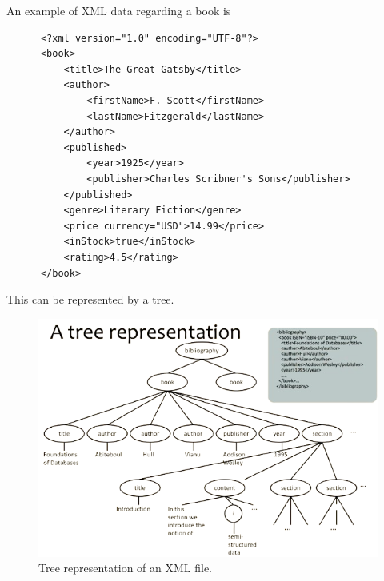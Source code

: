   \begin{example}
    An example of XML data regarding a book is 
    \begin{lstlisting}
      <?xml version="1.0" encoding="UTF-8"?>
      <book>
          <title>The Great Gatsby</title>
          <author>
              <firstName>F. Scott</firstName>
              <lastName>Fitzgerald</lastName>
          </author>
          <published>
              <year>1925</year>
              <publisher>Charles Scribner's Sons</publisher>
          </published>
          <genre>Literary Fiction</genre>
          <price currency="USD">14.99</price>
          <inStock>true</inStock>
          <rating>4.5</rating>
      </book> 
    \end{lstlisting}
    This can be represented by a tree. 

    \begin{figure}[H]
      \centering 
      \includegraphics[scale=0.5]{img/tree_rep.png}
      \caption{Tree representation of an XML file.} 
      \label{fig:tree_rep}
    \end{figure}
  \end{example}


